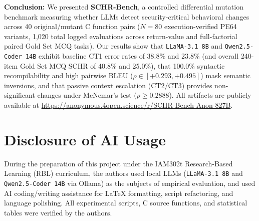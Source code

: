 \documentclass[conference]{IEEEtran}
\begin{document}
\textbf{Conclusion:} We presented \textbf{SCHR-Bench}, a controlled differential mutation benchmark measuring whether LLMs detect security-critical behavioral changes across 40 original/mutant C function pairs ($N=80$ execution-verified PE64 variants, 1,020 total logged evaluations across return-value and full-factorial paired Gold Set MCQ tasks). Our results show that \texttt{LLaMA-3.1 8B} and \texttt{Qwen2.5-Coder 14B} exhibit baseline CT1 error rates of 38.8\% and 23.8\% (and overall 240-item Gold Set MCQ SCHR of 40.8\% and 25.0\%), that 100.0\% syntactic recompilability and high pairwise BLEU ($\rho \in [+0.293, +0.495]$) mask semantic inversions, and that passive context escalation (CT2/CT3) provides non-significant changes under McNemar's test ($p \ge 0.2888$). All artifacts are publicly available at \url{https://anonymous.4open.science/r/SCHR-Bench-Anon-827B}.

\section*{Disclosure of AI Usage}
During the preparation of this project under the IAM302t Research-Based Learning (RBL) curriculum, the authors used local LLMs (\texttt{LLaMA-3.1 8B} and \texttt{Qwen2.5-Coder 14B} via Ollama) as the subjects of empirical evaluation, and used AI coding/writing assistance for LaTeX formatting, script refactoring, and language polishing. All experimental scripts, C source functions, and statistical tables were verified by the authors.

\balance


\end{document}
